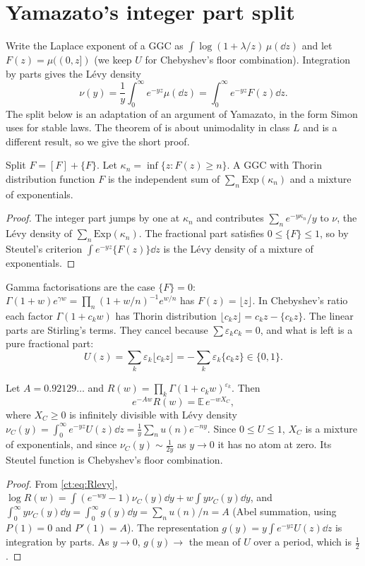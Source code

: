 \section{Yamazato's integer part split}\label{ct:sec:yamazato}

Write the Laplace exponent of a GGC as $\int\log(1+\lambda/z)\,\mu(\dd z)$ and let $F(z)=\mu((0,z])$ (we keep $U$ for Chebyshev's floor combination). Integration by parts gives the L\'evy density
\[
\nu(y)=\frac1y\int_0^\infty e^{-yz}\mu(\dd z)=\int_0^\infty e^{-yz}F(z)\dd z .
\]
The split below is an adaptation of an argument of Yamazato, in the form Simon uses for stable laws. The theorem of \cite{Yamazato78} is about unimodality in class $L$ and is a different result, so we give the short proof. 
\begin{lemma}\label{ct:lem:split}
Split $F=[F]+\{F\}$. Let $\kappa_n=\inf\{z:F(z)\ge n\}$. A GGC with Thorin distribution function $F$ is the independent sum of $\sum_n\mathrm{Exp}(\kappa_n)$ and a mixture of exponentials.
\end{lemma}
\begin{proof}
The integer part jumps by one at $\kappa_n$ and contributes $\sum_n e^{-y\kappa_n}/y$ to $\nu$, the L\'evy density of $\sum_n\mathrm{Exp}(\kappa_n)$. The fractional part satisfies $0\le\{F\}\le1$, so by Steutel's criterion \cite{Steutel67} $\int e^{-yz}\{F(z)\}\dd z$ is the L\'evy density of a mixture of exponentials.
\end{proof}

Gamma factorisations are the case $\{F\}=0$: $\Gamma(1+w)e^{\gamma w}=\prod_n(1+w/n)^{-1}e^{w/n}$ has $F(z)=\lfloor z\rfloor$. In Chebyshev's ratio each factor $\Gamma(1+c_kw)$ has Thorin distribution $\lfloor c_kz\rfloor=c_kz-\{c_kz\}$. The linear parts are Stirling's terms. They cancel because $\sum\varepsilon_kc_k=0$, and what is left is a pure fractional part:
\[
U(z)=\sum_k\varepsilon_k\lfloor c_kz\rfloor=-\sum_k\varepsilon_k\{c_kz\}\in\{0,1\}.
\]

\begin{theorem}\label{ct:thm:chebME}
Let $A=0.92129\ldots$ and $R(w)=\prod_k\Gamma(1+c_kw)^{\varepsilon_k}$. Then
\[
e^{-Aw}R(w)=\mathbb E\,e^{-wX_C},
\]
where $X_C\ge0$ is infinitely divisible with L\'evy density $\nu_C(y)=\int_0^\infty e^{-yz}U(z)\dd z=\frac1y\sum_nu(n)e^{-ny}$. Since $0\le U\le1$, $X_C$ is a mixture of exponentials, and since $\nu_C(y)\sim\frac{1}{2y}$ as $y\to0$ it has no atom at zero. Its Steutel function is Chebyshev's floor combination.
\end{theorem}
\begin{proof}
From \eqref{ct:eq:Rlevy}, $\log R(w)=\int(e^{-wy}-1)\nu_C(y)\dd y+w\int y\nu_C(y)\dd y$, and $\int_0^\infty y\nu_C(y)\dd y=\int_0^\infty g(y)\dd y=\sum_nu(n)/n=A$ (Abel summation, using $P(1)=0$ and $P'(1)=A$). The representation $g(y)=y\int e^{-yz}U(z)\dd z$ is integration by parts. As $y\to0$, $g(y)\to$ the mean of $U$ over a period, which is $\tfrac12$.
\end{proof}

